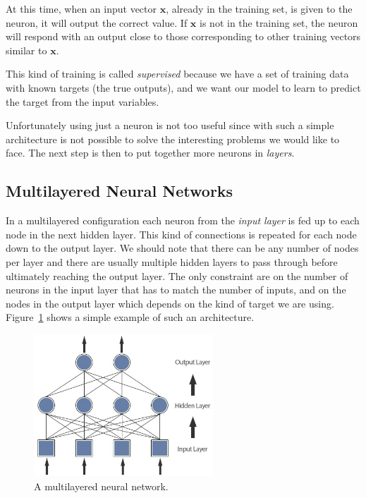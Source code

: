 At this time, when an input vector \(\mathbf{x}\), already in the training set, is given to the neuron, it will output the correct value. If \(\mathbf{x}\) is not in the training set, the neuron will respond with an output close to those corresponding to other training vectors similar to \(\mathbf{x}\).

This kind of training is called \emph{supervised} because we have a set of training data with known targets (the true outputs), and we want our model to learn to predict the target from the input variables.

Unfortunately using just a neuron is not too useful since with such a simple architecture is not possible to solve the interesting problems we would like to face. 
The next step is then to put together more neurons in \emph{layers}.

\subsection{Multilayered Neural Networks}
\label{multi-layered-neural-networks}

In a multilayered configuration each neuron from the \emph{input layer} is fed up to each node in the next hidden layer. This kind of connections is repeated for each node down to the output layer. 
We should note that there can be any number of nodes per layer and there are usually multiple hidden layers to pass through before ultimately reaching the output layer. The only constraint are on the number of neurons in the input layer that has to match the number of inputs, and on the nodes in the output layer which depends on the kind of target we are using. Figure~\ref{fig:multilayered_nn} shows a simple example of such an architecture.

\begin{figure}[htb]
	\centering
	\includegraphics[width=0.6\textwidth]{figures/multilayer.jpeg}
	\caption{A multilayered neural network.}
	\label{fig:multilayered_nn}
\end{figure}

